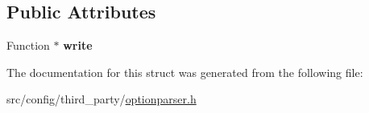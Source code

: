 \subsection*{Public Attributes}
\begin{DoxyCompactItemize}
\item 
\hypertarget{structxmem_1_1config_1_1third__party_1_1_print_usage_implementation_1_1_function_writer_a15527210bafed3bf8accf1071a2ed710}{}Function $\ast$ {\bfseries write}\label{structxmem_1_1config_1_1third__party_1_1_print_usage_implementation_1_1_function_writer_a15527210bafed3bf8accf1071a2ed710}

\end{DoxyCompactItemize}


The documentation for this struct was generated from the following file\+:\begin{DoxyCompactItemize}
\item 
src/config/third\+\_\+party/\hyperlink{optionparser_8h}{optionparser.\+h}\end{DoxyCompactItemize}
